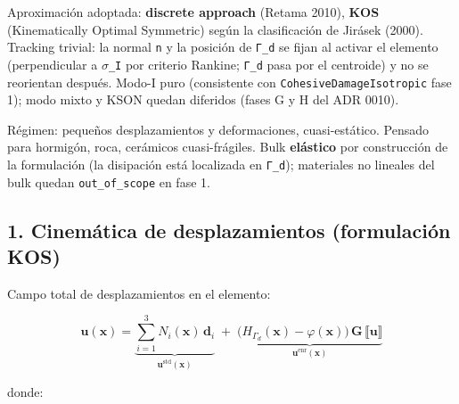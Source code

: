 \documentclass[11pt,letterpaper,oneside]{report}
\begin{document}
Aproximación adoptada: \textbf{discrete approach} (Retama 2010), \textbf{KOS} (Kinematically Optimal Symmetric) según la clasificación de Jirásek (2000). Tracking trivial: la normal \texttt{n} y la posición de \texttt{Γ\_d} se fijan al activar el elemento (perpendicular a \texttt{\ensuremath{\sigma}\_I} por criterio Rankine; \texttt{Γ\_d} pasa por el centroide) y no se reorientan después. Modo-I puro (consistente con \texttt{CohesiveDamageIsotropic} fase 1); modo mixto y KSON quedan diferidos (fases G y H del ADR 0010).

Régimen: pequeños desplazamientos y deformaciones, cuasi-estático. Pensado para hormigón, roca, cerámicos cuasi-frágiles. Bulk \textbf{elástico} por construcción de la formulación (la disipación está localizada en \texttt{Γ\_d}); materiales no lineales del bulk quedan \texttt{out\_of\_scope} en fase 1.

\subsection{1. Cinemática de desplazamientos (formulación KOS)}

Campo total de desplazamientos en el elemento:

\[
\mathbf u(\mathbf x) = \underbrace{\sum_{i=1}^{3} N_i(\mathbf x)\,\mathbf d_i}_{\mathbf u^{\text{std}}(\mathbf x)} \;+\; \underbrace{\bigl(H_{\Gamma_d}(\mathbf x) - \varphi(\mathbf x)\bigr)\,\mathbf G \,\llbracket\mathbf u\rrbracket}_{\mathbf u^{\text{enr}}(\mathbf x)}
\]

donde:
\end{document}
